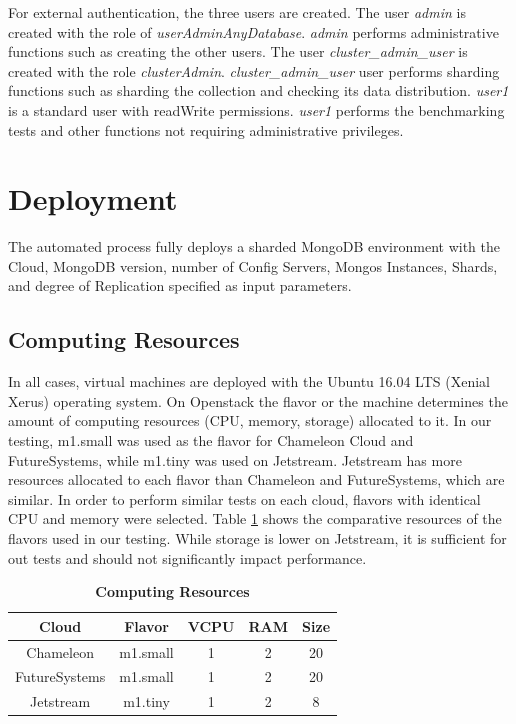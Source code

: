 \documentclass[9pt,twocolumn,twoside]{../../styles/osajnl}
\begin{document}
For external authentication, the three users are created.  The user \emph{admin} is created with the role of \emph{userAdminAnyDatabase}.  \emph{admin} performs administrative functions such as creating the other users.  The user \emph{cluster\_admin\_user} is created with the role \emph{clusterAdmin}. \emph{cluster\_admin\_user} user performs sharding functions such as sharding the collection and checking its data distribution. \emph{user1} is a standard user with readWrite permissions.  \emph{user1} performs the benchmarking tests and other functions not requiring administrative privileges.



\section{Deployment}


The automated process fully deploys a sharded MongoDB environment with the Cloud, MongoDB version, number of Config Servers, Mongos Instances, Shards, and degree of Replication specified as input parameters.

\subsection{Computing Resources}

In all cases, virtual machines are deployed with the Ubuntu 16.04 LTS (Xenial Xerus) operating system.  On Openstack the flavor or the machine determines the amount of computing resources (CPU, memory, storage) allocated to it.  In our testing, m1.small was used as the flavor for Chameleon Cloud and FutureSystems, while  m1.tiny was used on Jetstream.  Jetstream has more resources allocated to each flavor than Chameleon and FutureSystems, which are similar.  In order to perform similar tests on each cloud, flavors with identical CPU and memory were selected. Table \ref{tab:computing-resources} shows the comparative resources of the flavors used in our testing.  While storage is lower on Jetstream, it is sufficient for out tests and should not significantly impact performance.

\begin{table}[htbp]
\centering
\caption{\bf Computing Resources}

 \begin{tabular}{|c | c | c | c| c|} 
 \hline
 
Cloud &  Flavor & VCPU & RAM & Size \\ [0.5ex] 
 \hline
    
Chameleon &  m1.small & 1 & 2 &	20 \\
 \hline
FutureSystems &  m1.small &  1 &	2 &	20 \\ 
 \hline
Jetstream &  m1.tiny &  1 &	2 &	8 \\ 
\hline
\end{tabular}
  \label{tab:computing-resources}
\end{table}
\end{document}
